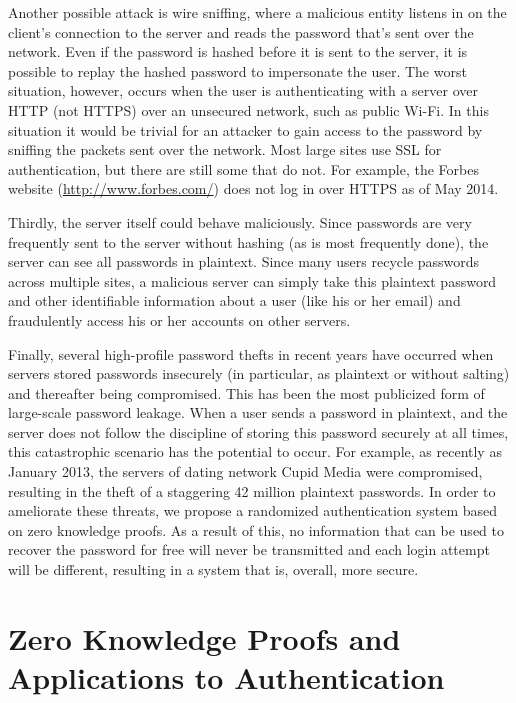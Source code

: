 \documentclass[11pt]{article}
\begin{document}
Another possible attack is wire sniffing, where a malicious entity listens in on the client’s connection to the server and reads the password that’s sent over the network\cite{Lum}.  Even if the password is hashed before it is sent to the server, it is possible to replay the hashed password to impersonate the user.  The worst situation, however, occurs when the user is authenticating with a server over HTTP (not HTTPS) over an unsecured network, such as public Wi-Fi.  In this situation it would be trivial for an attacker to gain access to the password by sniffing the packets sent over the network. Most large sites use SSL for authentication, but there are still some that do not.  For example, the Forbes website (\url{http://www.forbes.com/}) does not log in over HTTPS as of May 2014.

Thirdly, the server itself could behave maliciously. Since passwords are very frequently sent to the server without hashing (as is most frequently done), the server can see all passwords in plaintext. Since many users recycle passwords across multiple sites, a malicious server can simply take this plaintext password and other identifiable information about a user (like his or her email) and fraudulently access his or her accounts on other servers.

Finally, several high-profile password thefts in recent years have occurred when servers stored passwords insecurely (in particular, as plaintext or without salting) and thereafter being compromised.  This has been the most publicized form of large-scale password leakage.  When a user sends a password in plaintext, and the server does not follow the discipline of storing this password securely at all times, this catastrophic scenario has the potential to occur.  For example, as recently as January 2013, the servers of dating network Cupid Media were compromised, resulting in the theft of a staggering 42 million plaintext passwords.  \cite{Donohue}
In order to ameliorate these threats, we propose a randomized authentication system based on zero knowledge proofs. As a result of this, no information that can be used to recover the password for free will never be transmitted and each login attempt will be different, resulting in a system that is, overall, more secure.

\section{Zero Knowledge Proofs and Applications to Authentication}
\end{document}
